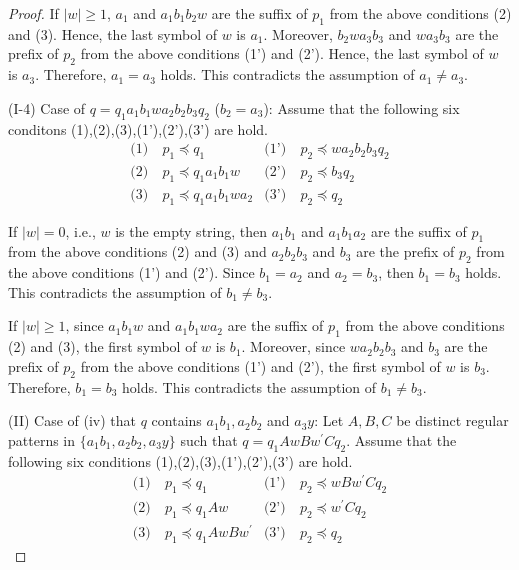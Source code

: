\begin{proof}
If $|w| \ge 1$, $a_{1}$ and $a_{1}b_{1}b_{2}w$ are the suffix of $p_{1}$ from the above conditions (2) and (3).
Hence, the last symbol of $w$ is $a_{1}$.
Moreover, $b_{2}wa_{3}b_{3}$ and $wa_{3}b_{3}$ are the prefix of $p_{2}$ from the above conditions (1') and (2').
Hence, the last symbol of $w$ is $a_{3}$.
Therefore, $a_{1}=a_{3}$ holds.
This contradicts the assumption of $a_{1} \ne a_{3}$.
\smallskip

\noindent
(I-4) Case of $q=q_{1}a_{1}b_{1}wa_{2}b_{2}b_{3}q_{2}$ ($b_{2}=a_{3}$):
Assume that the following six conditons (1),(2),(3),(1'),(2'),(3') are hold.
\begin{align*}
\textrm{(1)}~& p_{1} \preceq q_{1} & \textrm{(1')}~& p_{2} \preceq wa_{2}b_{2}b_{3}q_{2} \\
\textrm{(2)}~& p_{1} \preceq q_{1}a_{1}b_{1}w & \textrm{(2')}~& p_{2} \preceq b_{3}q_{2} \\
\textrm{(3)}~& p_{1} \preceq q_{1}a_{1}b_{1}wa_{2} & \textrm{(3')}~& p_{2} \preceq q_{2}
\end{align*}
\noindent

If $|w|=0$, i.e., $w$ is the empty string, then $a_{1}b_{1}$ and $a_{1}b_{1}a_{2}$ are the suffix of $p_{1}$ from the above conditions (2) and (3)
and $a_{2}b_{2}b_{3}$ and $b_{3}$ are the prefix of $p_{2}$ from the above conditions (1') and (2').
Since $b_{1}=a_{2}$ and $a_{2}=b_{3}$, then $b_{1}=b_{3}$ holds.
This contradicts the assumption of $b_{1}\not= b_{3}$.

If $|w| \ge 1$, since $a_{1}b_{1}w$ and $a_{1}b_{1}wa_{2}$ are the suffix of $p_{1}$ from the above conditions (2) and (3), the first symbol of $w$ is $b_{1}$.
Moreover, since $wa_{2}b_{2}b_{3}$ and $b_{3}$ are the prefix of $p_{2}$ from the above conditions (1') and (2'),
the first symbol of $w$ is $b_{3}$.
Therefore, $b_{1}=b_{3}$ holds.
This contradicts the assumption of $b_{1} \ne b_{3}$.


\smallskip

\noindent
(II) Case of (iv) that $q$ contains $a_{1}b_{1}, a_{2}b_{2}$ and $a_{3}y$:
Let $A,B,C$ be distinct regular patterns in $\{a_{1}b_{1}, a_{2}b_{2}, a_{3}y\}$ such that $q=q_{1}AwBw^{\prime}Cq_{2}$.
Assume that the following six conditions (1),(2),(3),(1'),(2'),(3') are hold.
\begin{align*}
\textrm{(1)}~& p_{1} \preceq q_{1} & \textrm{(1')}~& p_{2} \preceq wBw^{\prime}Cq_{2} \\
\textrm{(2)}~& p_{1} \preceq q_{1}Aw & \textrm{(2')}~& p_{2} \preceq w^{\prime}Cq_{2} \\
\textrm{(3)}~& p_{1} \preceq q_{1}AwBw^{\prime} & \textrm{(3')}~& p_{2} \preceq q_{2}
\end{align*}


\end{proof}

